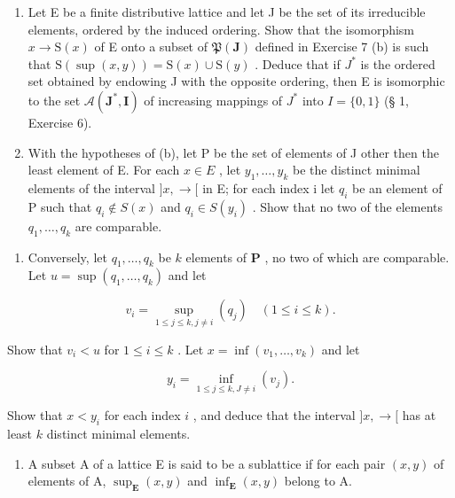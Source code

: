 \begin{enumerate}
\def\labelenumi{(\alph{enumi})}
\setcounter{enumi}{1}
\item
  Let E be a finite distributive lattice and let J be the set of its irreducible elements, ordered by the induced ordering. Show that the isomorphism \(x \to \mathrm{S}(x)\) of E onto a subset of \(\mathfrak{P}(\mathbf{J})\) defined in Exercise 7 (b) is such that \(\mathrm{S}(\sup(x,y)) = \mathrm{S}(x) \cup \mathrm{S}(y)\) . Deduce that if \(J^{*}\) is the ordered set obtained by endowing J with the opposite ordering, then E is isomorphic to the set \(\mathcal{A}(\mathbf{J}^{*}, \mathbf{I})\) of increasing mappings of \(J^{*}\) into \(I = \{0, 1\}\) (§ 1, Exercise 6).
\item
  With the hypotheses of (b), let P be the set of elements of J other then the least element of E. For each \(x \in E\) , let \(y_{1}, \ldots, y_{k}\) be the distinct minimal elements of the interval \(]x, \rightarrow[\) in E; for each index i let \(q_{i}\) be an element of P such that \(q_{i} \notin S(x)\) and \(q_{i} \in S(y_{i})\) . Show that no two of the elements \(q_{1}, \ldots, q_{k}\) are comparable.
\end{enumerate}

\begin{enumerate}
\def\labelenumi{(\alph{enumi})}
\setcounter{enumi}{3}
\tightlist
\item
  Conversely, let \(q_1, \ldots, q_k\) be \(k\) elements of \(\mathbf{P}\) , no two of which are comparable. Let \(u = \sup (q_1, \ldots, q_k)\) and let
\end{enumerate}

\[
v _ {i} = \sup _ {1 \leqslant j \leqslant k, j \neq i} (q _ {j}) \quad (1 \leqslant i \leqslant k).
\]

Show that \(v_{i} < u\) for \(1 \leqslant i \leqslant k\) . Let \(x = \inf (v_{1}, \ldots, v_{k})\) and let

\[
y _ {i} = \inf _ {1 \leqslant j \leqslant k, J \neq i} (v _ {j}).
\]

Show that \(x < y_i\) for each index \(i\) , and deduce that the interval \(]x, \to[\) has at least \(k\) distinct minimal elements.

\begin{enumerate}
\def\labelenumi{\arabic{enumi}.}
\setcounter{enumi}{8}
\tightlist
\item
  A subset A of a lattice E is said to be a sublattice if for each pair \((x, y)\) of elements of A, \(\sup_{\mathbf{E}}(x, y)\) and \(\inf_{\mathbf{E}}(x, y)\) belong to A.
\end{enumerate}

